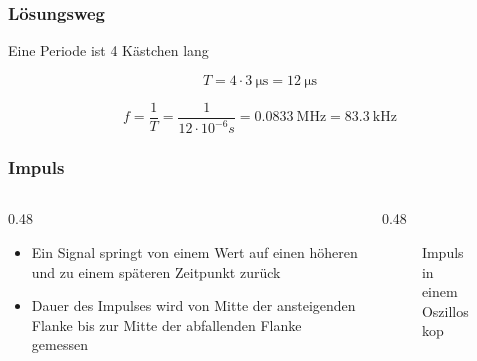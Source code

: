 \begin{frame}
\frametitle{Lösungsweg}
Eine Periode ist 4 Kästchen lang

$$T = 4\cdot \qty{3}{\micro\second} = \qty{12}{\micro\second}$$

$$f = \dfrac{1}{T} = \dfrac{1}{12\cdot10^{-6}s} = \qty{0,0833}{\mega\hertz} = \qty{83,3}{\kilo\hertz}$$

\end{frame}

\begin{frame}
\end{frame}

\begin{frame}
\frametitle{Impuls}
\begin{columns}
    \begin{column}{0.48\textwidth}
    \begin{itemize}
  \item Ein Signal springt von einem Wert auf einen höheren und zu einem späteren Zeitpunkt zurück
  \item Dauer des Impulses wird von Mitte der ansteigenden Flanke bis zur Mitte der abfallenden Flanke gemessen
  \end{itemize}

    \end{column}
   \begin{column}{0.48\textwidth}
       
\begin{figure}
    \caption{\scriptsize Impuls in einem Oszilloskop}
    \label{e_impuls}
\end{figure}

 
   \end{column}
\end{columns}

\end{frame}

